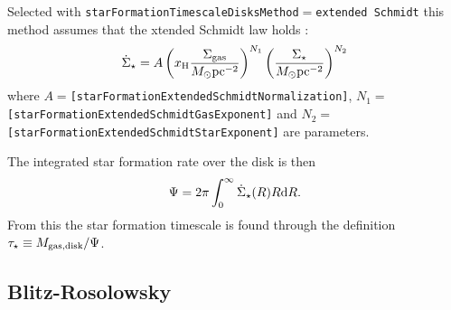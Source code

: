 Selected with {\tt starFormationTimescaleDisksMethod}$=${\tt extended Schmidt} this method assumes that the xtended Schmidt law holds \citep{shi_extended_2011}:
\begin{equation}
\dot{\Sigma}_\star = A \left(x_{\rm H} {\Sigma_{\rm gas}\over M_\odot \hbox{pc}^{-2}}\right)^{N_1} \left({\Sigma_{\star}\over M_\odot \hbox{pc}^{-2}}\right)^{N_2}
\end{equation}
where $A=${\tt [starFormationExtendedSchmidtNormalization]}, $N_1=${\tt
[starFormationExtendedSchmidtGasExponent]} and $N_2=${\tt [starFormationExtendedSchmidtStarExponent]} are parameters. 

The integrated star formation rate over the disk is then
\begin{equation}
\Psi = 2 \pi \int_0^\infty \dot{\Sigma}_\star(R) R \d R.
\end{equation}
From this the star formation timescale is found through the definition $\tau_\star \equiv M_{\rm gas, disk}/\Psi$.

\subsection{Blitz-Rosolowsky}\label{sec:StarFormationBlitzRosolowsky}

